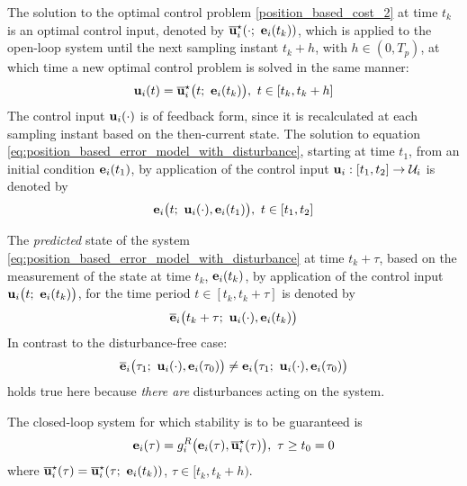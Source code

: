 The solution to the optimal control problem \eqref{position_based_cost_2}
at time $t_k$ is an optimal control input, denoted by
$\overline{\bm{\mathbf{u}}}_i^{\star}(\cdot;\ \bm{\mathbf{e}}_i(t_k))$, which
is applied to the open-loop system until the next sampling instant $t_k + h$,
with $h \in (0,T_p)$, at which time a new optimal control problem is solved in
the same manner:
\begin{align}
  \bm{\mathbf{u}}_i(t) = \overline{\bm{\mathbf{u}}}_i^{\star}\big(t;\ \bm{\mathbf{e}}_i(t_k)\big),\  t \in [t_k, t_k + h]
 \label{eq:position_based_optimal_u_2}
\end{align}
The control input $\bm{\mathbf{u}}_i(\cdot)$ is of feedback form,
since it is recalculated at each sampling instant based on the then-current
state. The solution to equation \eqref{eq:position_based_error_model_with_disturbance}, starting at time
$t_1$, from an initial condition $\bm{\mathbf{e}}_i(t_1)$, by application of the
control input $\bm{\mathbf{u}}_i : [t_1, t_2] \to \mathcal{U}_i$ is denoted by
\begin{align}
  \bm{\mathbf{e}}_i\big(t;\ \bm{\mathbf{u}}_i(\cdot), \bm{\mathbf{e}}_i(t_1)\big),\ t \in [t_1, t_2]
\end{align}

The \textit{predicted} state of the system \eqref{eq:position_based_error_model_with_disturbance}
at time $t_k + \tau$, based on the measurement of the state at time
$t_k$, $\bm{\mathbf{e}}_i(t_k)$, by application of the control input
$\bm{\mathbf{u}}_i\big(t;\ \bm{\mathbf{e}}_i(t_k)\big)$, for the time period $t \in [t_k, t_k + \tau]$
is denoted by
\begin{align}
  \overline{\bm{\mathbf{e}}}_i\big(t_k + \tau;\ \bm{\mathbf{u}}_i(\cdot), \bm{\mathbf{e}}_i(t_k)\big) \label{eq:position_based_predicted_error_0_2}
\end{align}
In contrast to the disturbance-free case:
\begin{align}
  \overline{\bm{\mathbf{e}}}_i\big(\tau_1;\ \bm{\mathbf{u}}_i(\cdot), \bm{\mathbf{e}}_i(\tau_0)\big) \not=
  \bm{\mathbf{e}}_i\big(\tau_1;\ \bm{\mathbf{u}}_i(\cdot), \bm{\mathbf{e}}_i(\tau_0)\big)
  \label{eq:error_now_to_predicted_error_2}
\end{align}
holds true here because \textit{there are} disturbances acting on the system.

The closed-loop system for which stability is to be guaranteed is
\begin{align}
  \bm{\mathbf{e}}_i(\tau) = g_i^R\big(\bm{\mathbf{e}}_i(\tau), \overline{\bm{\mathbf{u}}}_i^{\star}(\tau)\big),\ \tau \geq t_0 = 0
  \label{eq:without_disturbances_closed_loop_2}
\end{align}
where $\overline{\bm{\mathbf{u}}}_i^{\star}(\tau) = \overline{\bm{\mathbf{u}}}_i^{\star}(\tau;\ \bm{\mathbf{e}}_i(t_k))$,
$\tau \in [t_k, t_k + h)$.


